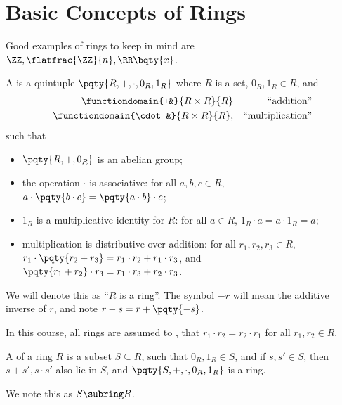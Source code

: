 \section{Basic Concepts of Rings}

Good examples of rings to keep in mind are \(\ZZ, \flatfrac{\ZZ}{n}, \RR \bqty{x}\).

\begin{definition}[Ring]
    \label{def:ring}%
    A  is a quintuple \(\pqty{R, +, \cdot, 0_R, 1_R}\) where \(R\) is a set, \(0_R, 1_R \in R\), and
    \begin{align*}
        \functiondomain{+&}{R \times R}{R} && \text{``addition''} \\
        \functiondomain{\cdot&}{R \times R}{R}, && \text{``multiplication''}
    \end{align*}
    such that
    \begin{itemize}
        \item \(\pqty{R, +, 0_R}\) is an abelian group;
        \item the operation \(\cdot\) is associative: for all \(a, b, c \in R\), \(a \cdot \pqty{b \cdot c} = \pqty{a \cdot b} \cdot c\);
        \item \(1_R\) is a multiplicative identity for \(R\): for all \(a \in R\), \(1_R \cdot a = a \cdot 1_R = a\);
        \item multiplication is distributive over addition: for all \(r_1, r_2, r_3 \in R\), \(r_1 \cdot \pqty{r_2 + r_3} = r_1 \cdot r_2 + r_1 \cdot r_3\), and \(\pqty{r_1 + r_2} \cdot r_3 = r_1 \cdot r_3 + r_2 \cdot r_3\).
    \end{itemize}
\end{definition}

\begin{notation}
    We will denote this as ``\(R\) is a ring''. The symbol \(-r\) will mean the additive inverse of \(r\), and note \(r - s = r + \pqty{-s}\).
\end{notation}

\begin{remark}
    In this course, all rings are assumed to , that \(r_1 \cdot r_2 = r_2 \cdot r_1\) for all \(r_1, r_2 \in R\).
\end{remark}

\begin{definition}[Subring]
    \label{def:subring}%
    A  of a ring \(R\) is a subset \(S \subseteq R\), such that \(0_R, 1_R \in S\), and if \(s, s' \in S\), then \(s + s', s \cdot s'\) also lie in \(S\), and \(\pqty{S, +, \cdot, 0_R, 1_R}\) is a ring.

    We note this as \(S \subring R\).
\end{definition}

